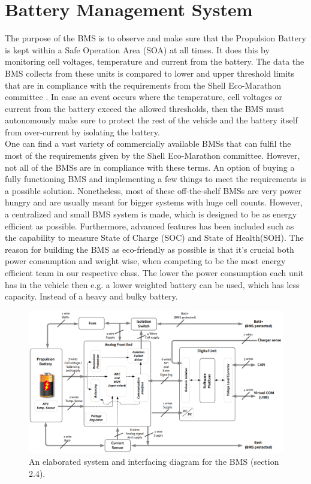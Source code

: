 \newpage
\section{Battery Management System}
\label{sec:BMSHWChapter}
The purpose of the BMS is to observe and make sure that the Propulsion Battery is kept within a Safe Operation Area (SOA) at all times. It does this by monitoring cell voltages, temperature and current from the battery. The data the BMS collects from these units is compared to lower and upper threshold limits that are in compliance with the requirements from the Shell Eco-Marathon committee \cite{ShellRequirements}. In case an event occurs where the temperature, cell voltages or current from the battery exceed the allowed thresholds, then the BMS must autonomously make sure to protect the rest of the vehicle and the battery itself from over-current by isolating the battery. \\
One can find a vast variety of commercially available BMSs that can fulfil the most of the requirements given by the Shell Eco-Marathon committee. However, not all of the BMSs are in compliance with these terms. An option of buying a fully functioning BMS and implementing a few things to meet the requirements is a possible solution. Nonetheless, most of these off-the-shelf BMSs are very power hungry and are usually meant for bigger systems with huge cell counts. However, a centralized and small BMS system is made, which is designed to be as energy efficient as possible. Furthermore, advanced features has been included such as the capability to measure State of Charge (SOC) and State of Health(SOH). The reason for building the BMS as eco-friendly as possible is that it's crucial both power consumption and weight wise, when competing to be the most energy efficient team in our respective class. The lower the power consumption each unit has in the vehicle then e.g. a lower weighted battery can be used, which has less capacity. Instead of a heavy and bulky battery.\\

\begin{figure}[H]
	\centering
	\includegraphics[width=1.0\linewidth]{Hardware/Pictures/BMSOverview}
	\caption[Empty]{An elaborated system and interfacing diagram for the BMS \cite{BMSDocumentation} (section 2.4).}
	\label{fig:BMSOverview}
\end{figure}

